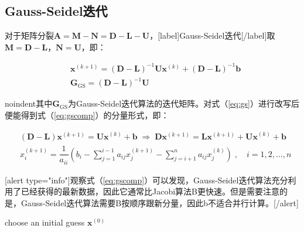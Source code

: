 \documentclass[12pt, UTF8, nofonts]{ctexart}
\begin{document}
\subsection*{Gauss-Seidel迭代}

对于矩阵分裂$\boldsymbol{A}=\boldsymbol{M}-\boldsymbol{N}=\boldsymbol{D}-\boldsymbol{L}-\boldsymbol{U}$，[label]Gauss-Seidel迭代[/label]取$\boldsymbol{M}=\boldsymbol{D}-\boldsymbol{L}$，$\boldsymbol{N}=\boldsymbol{U}$，即：

\begin{eqnarray}
    \label{eq:gs}
    & \boldsymbol{x}^{(k+1)}=(\boldsymbol{D}-\boldsymbol{L})^{-1}\boldsymbol{U}\boldsymbol{x}^{(k)}+(\boldsymbol{D}-\boldsymbol{L})^{-1}\boldsymbol{b} \\
    & \boldsymbol{G}_{\mathrm{GS}}=(\boldsymbol{D}-\boldsymbol{L})^{-1}\boldsymbol{U}
\end{eqnarray}

noindent其中$\boldsymbol{G}_{\mathrm{GS}}$为Gauss-Seidel迭代算法的迭代矩阵。对式（\ref{eq:gs}）进行改写后便能得到式（\ref{eq:gscomp}）的分量形式，即：

\begin{eqnarray}
    \label{eq:gscomp}
    & (\boldsymbol{D}-\boldsymbol{L})\boldsymbol{x}^{(k+1)} = \boldsymbol{Ux}^{(k)}+\boldsymbol{b} \;\Rightarrow\;
    \boldsymbol{D}\boldsymbol{x}^{(k+1)}=\boldsymbol{L}\boldsymbol{x}^{(k+1)} +\boldsymbol{Ux}^{(k)}+\boldsymbol{b} \\
    & \displaystyle x_{i}^{(k+1)} = \dfrac{1}{a_{ii}}\left(b_i-\sum_{j=1}^{i-1}a_{ij}x_j^{(k+1)}-\sum_{j=i+1}^{n}a_{ij}x_{j}^{(k)}\right) \;,\quad i=1,2,\ldots,n
\end{eqnarray}

[alert type="info"]观察式（\ref{eq:gscomp}）可以发现，Gauss-Seidel迭代算法充分利用了已经获得的最新数据，因此它通常比Jacobi算法B更快速。但是需要注意的是，Gauss-Seidel迭代算法需要B按顺序跟新分量，因此b不适合并行计算。[/alert]

\begin{algorithm}[H]
    choose an initial guess $\boldsymbol{x}^{(0)}$ \;
\end{algorithm}
\end{document}

